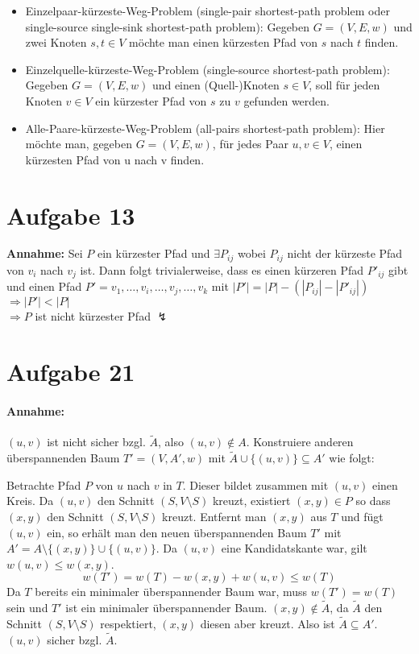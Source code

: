 \documentclass[10pt,a4paper]{article}
\begin{document}
    \begin{itemize}
        \item   Einzelpaar-kürzeste-Weg-Problem (single-pair shortest-path problem oder
        single-source single-sink shortest-path problem): Gegeben $G = (V, E, w)$ und zwei
        Knoten $s,t \in V$ möchte man einen kürzesten Pfad von  $s$ nach $t$ finden.
        \item Einzelquelle-kürzeste-Weg-Problem (single-source shortest-path problem):
        Gegeben $G = (V, E, w)$ und einen (Quell-)Knoten $s \in V$, soll für jeden Knoten $v \in V$
        ein kürzester Pfad von $s$ zu $v$ gefunden werden.
        \item Alle-Paare-kürzeste-Weg-Problem (all-pairs shortest-path problem): Hier möchte
		man, gegeben $G = (V, E, w)$, für jedes Paar $u,v \in V$, einen kürzesten Pfad von u nach v
		finden.
	\end{itemize}

\section*{Aufgabe 13}
    \textbf{Annahme: } Sei $P$ ein kürzester Pfad und $\exists P_{ij}$
    wobei $P_{ij}$ nicht der kürzeste Pfad von $v_i$ nach $v_j$ ist.
    Dann folgt trivialerweise, dass es einen kürzeren Pfad $P'_{ij}$ gibt
    und einen Pfad $P' = v_1, \ldots, v_i, \ldots, v_j, \ldots, v_k$ mit
    $|P'| = |P| - (|P_{ij}| - |P'_{ij}|)$ \\ $\Rightarrow |P'| < |P|$
    \\ $\Rightarrow P$ ist nicht kürzester Pfad $\lightning$



\section*{Aufgabe 21}
	\paragraph{Annahme:} $(u,v)$ ist nicht sicher bzgl. $\tilde{A}$, also $(u, v) \notin A$.
	Konstruiere anderen überspannenden Baum $T' = (V, A', w)$ mit $\tilde{A} \cup \{(u,v)\} \subseteq A'$ wie folgt:

	Betrachte Pfad $P$ von $u$ nach $v$ in $T$. Dieser bildet zusammen mit $(u, v)$ einen Kreis.
	Da $(u,v)$ den Schnitt $(S, V \setminus S)$ kreuzt, existiert $(x, y) \in P$ so dass $(x, y)$ den Schnitt $(S, V \setminus S)$ kreuzt.
	Entfernt man $(x,y)$ aus $T$ und fügt $(u,v)$ ein, so erhält man den neuen überspannenden Baum $T'$
	mit $A' = A \setminus \{(x, y)\} \cup \{(u, v)\}$.
	Da $(u, v)$ eine Kandidatskante war, gilt $w(u,v) \leq w(x, y)$.
	\begin{equation*}
	w(T') = w(T) - w(x, y) + w(u,v) \leq w(T)
	\end{equation*}
	Da $T$ bereits ein minimaler überspannender Baum war, muss $w(T') = w(T)$ sein und $T'$ ist ein minimaler überspannender Baum.
	$(x, y) \notin \tilde{A}$, da $\tilde{A}$ den Schnitt $(S, V \setminus S)$ respektiert, $(x, y)$ diesen aber kreuzt.
	Also ist $\tilde{A} \subseteq A'$. $(u, v)$ sicher bzgl. $\tilde{A}$.
\end{document}
